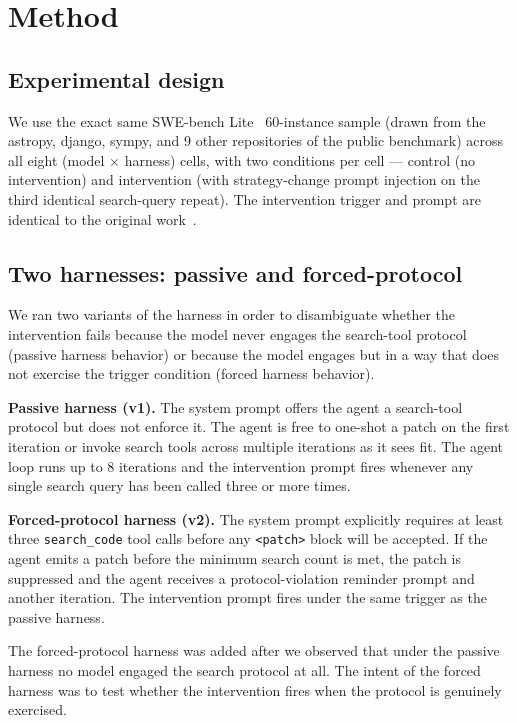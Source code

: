 \documentclass[journal]{IEEEtran}
\begin{document}
\section{Method}

\subsection{Experimental design}

We use the exact same SWE-bench Lite~\cite{swebench} 60-instance sample (drawn from the astropy, django, sympy, and 9 other repositories of the public benchmark) across all eight (model $\times$ harness) cells, with two conditions per cell — control (no intervention) and intervention (with strategy-change prompt injection on the third identical search-query repeat). The intervention trigger and prompt are identical to the original work~\cite{aiware2026}.

\subsection{Two harnesses: passive and forced-protocol}

We ran two variants of the harness in order to disambiguate whether the intervention fails because the model never engages the search-tool protocol (passive harness behavior) or because the model engages but in a way that does not exercise the trigger condition (forced harness behavior).

\textbf{Passive harness (v1).} The system prompt offers the agent a search-tool protocol but does not enforce it. The agent is free to one-shot a patch on the first iteration or invoke search tools across multiple iterations as it sees fit. The agent loop runs up to 8 iterations and the intervention prompt fires whenever any single search query has been called three or more times.

\textbf{Forced-protocol harness (v2).} The system prompt explicitly requires at least three \texttt{search\_code} tool calls before any \texttt{<patch>} block will be accepted. If the agent emits a patch before the minimum search count is met, the patch is suppressed and the agent receives a protocol-violation reminder prompt and another iteration. The intervention prompt fires under the same trigger as the passive harness.

The forced-protocol harness was added after we observed that under the passive harness no model engaged the search protocol at all. The intent of the forced harness was to test whether the intervention fires when the protocol is genuinely exercised.
\end{document}
